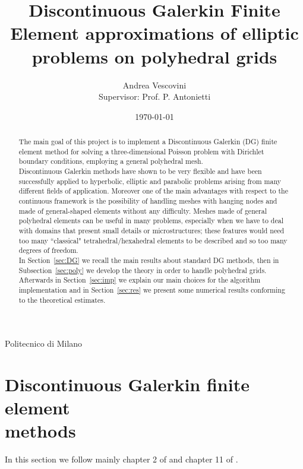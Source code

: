 \documentclass[12pt, a4paper]{article}
\title{\textbf{Discontinuous Galerkin Finite Element approximations of elliptic 
problems on polyhedral grids}}
\author{Andrea Vescovini\\[1cm]{\small Supervisor: Prof. P. Antonietti}}
\date{\today}
\theoremstyle{definition}
\theoremstyle{plain}
\theoremstyle{plain}
\theoremstyle{definition}
\begin{document}
\maketitle
\centerline{Politecnico di Milano}
\newpage
\begin{abstract}
	The main goal of this project is to implement a Discontinuous Galerkin (DG) 
	finite element method for solving a three-dimensional Poisson problem with 
	Dirichlet boundary conditions, employing a general polyhedral mesh.\\
	Discontinuous Galerkin methods have shown to be very flexible and have been 
	successfully 
	applied to hyperbolic, elliptic and parabolic problems arising from many 
	different fields of application.
	Moreover one of the main advantages with respect to the continuous 
	framework is the possibility of handling meshes with hanging nodes and made 
	of general-shaped elements without any difficulty. Meshes made of 
	general polyhedral elements can be useful in many problems, especially when 
	we have to deal with domains that present small details or microstructures; 
	these features would need too many ``classical" tetrahedral/hexahedral 
	elements to be described and so too many degrees of freedom.\\
	In Section~\ref{sec:DG} we recall the main results about standard DG 
	methods, then in Subsection~\ref{sec:poly} we develop the theory in order 
	to 
	handle polyhedral grids. Afterwards in Section~\ref{sec:imp} we explain our 
	main choices for the algorithm implementation and in Section~\ref{sec:res} 
	we present some numerical results conforming to the theoretical estimates.
\end{abstract}
\newpage
{}
\tableofcontents
\newpage



\section[Discontinuous Galerkin finite element methods]{Discontinuous Galerkin 
finite element\\methods}\label{sec:DG}
In this section we follow mainly chapter 2 of \cite{riviere} and chapter 11 of \cite{quart}.
\end{document}
